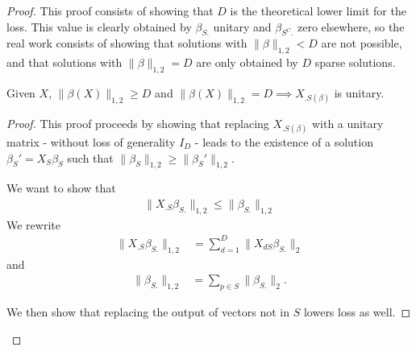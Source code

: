  \begin{proof}

This proof consists of showing that $D$ is the theoretical lower limit for the loss.
This value is clearly obtained by $\beta_{S.}$ unitary and $\beta_{S^C.}$ zero elsewhere, so the real work consists of showing that solutions with $\|\beta\|_{1,2} < D$ are not possible, and that solutions with $\|\beta\|_{1,2}  = D$ are only obtained by $D$ sparse solutions.

\begin{proposition}[Unitary Preference]
Given $X$, $\|\beta(X)\|_{1,2} \geq D$ and $\|\beta(X)\|_{1,2} = D \implies X_{.S(\beta)}$ is unitary. 
\end{proposition}

\begin{proof}

This proof proceeds by showing that replacing $X_{.S(\beta)}$ with a unitary matrix - without loss of generality $I_D$ - leads to the existence of a solution $\beta_S' = X_S \beta_S$ such that $\|\beta_S\|_{1,2} \geq \|\beta_S' \|_{1,2}$.


We want to show that 
\begin{align}
\| X_{.S} \beta_{S.}  \|_{1,2} \leq \|\beta_{S.}\|_{1,2} %
\end{align}
We rewrite 
\begin{align}
\| X_{.S} \beta_{S.}  \|_{1,2}  &= \sum_{d=1}^D \| X_{dS}  \beta_{S.}  \|_{2}  
\end{align}
and
\begin{align}
\| \beta_{S.}  \|_{1,2}  &= \sum_{p \in S} \| \beta_{S.}  \|_{2}.
\end{align}


We then show that replacing the output of vectors not in $S$ lowers loss as well.





\end{proof}
\end{proof}

